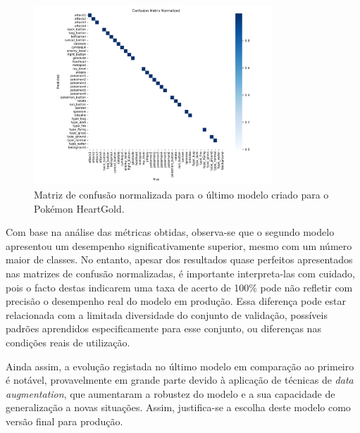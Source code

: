 \begin{figure}[!h]
    \centering
    \includegraphics[width=0.80\textwidth]{imagens/confusion_matrix_normalized_segundo_modelo.png}
    \caption{Matriz de confusão normalizada para o último modelo criado para o Pokémon HeartGold.}
    \label{fig:confusion_matrix_ultimmo_modelo}
\end{figure}

Com base na análise das métricas obtidas, observa-se que o segundo modelo apresentou um desempenho significativamente superior, mesmo com um número maior de classes. No entanto, apesar dos resultados quase perfeitos apresentados nas matrizes de confusão normalizadas, é importante interpreta-las com cuidado, pois o facto destas indicarem uma taxa de acerto de 100\% pode não refletir com precisão o desempenho real do modelo em produção. Essa diferença pode estar relacionada com a limitada diversidade do conjunto de validação, possíveis padrões aprendidos especificamente para esse conjunto, ou diferenças nas condições reais de utilização.

Ainda assim, a evolução registada no último modelo em comparação ao primeiro é notável, provavelmente em grande parte devido à aplicação de técnicas de \textit{data augmentation}, que aumentaram a robustez do modelo e a sua capacidade de generalização a novas situações. Assim, justifica-se a escolha deste modelo como versão final para produção.